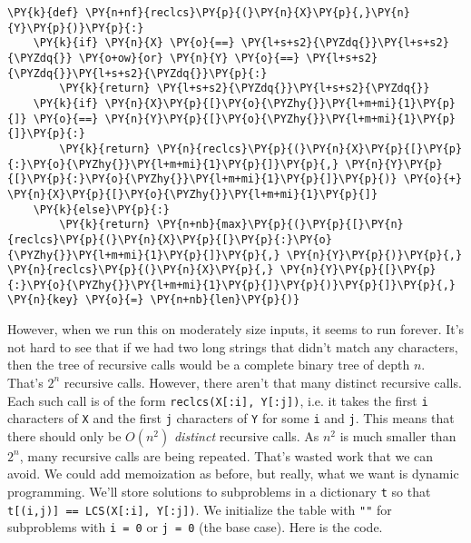 \begin{Verbatim}[commandchars=\\\{\}]
\PY{k}{def} \PY{n+nf}{reclcs}\PY{p}{(}\PY{n}{X}\PY{p}{,}\PY{n}{Y}\PY{p}{)}\PY{p}{:}
    \PY{k}{if} \PY{n}{X} \PY{o}{==} \PY{l+s+s2}{\PYZdq{}}\PY{l+s+s2}{\PYZdq{}} \PY{o+ow}{or} \PY{n}{Y} \PY{o}{==} \PY{l+s+s2}{\PYZdq{}}\PY{l+s+s2}{\PYZdq{}}\PY{p}{:}
        \PY{k}{return} \PY{l+s+s2}{\PYZdq{}}\PY{l+s+s2}{\PYZdq{}}
    \PY{k}{if} \PY{n}{X}\PY{p}{[}\PY{o}{\PYZhy{}}\PY{l+m+mi}{1}\PY{p}{]} \PY{o}{==} \PY{n}{Y}\PY{p}{[}\PY{o}{\PYZhy{}}\PY{l+m+mi}{1}\PY{p}{]}\PY{p}{:}
        \PY{k}{return} \PY{n}{reclcs}\PY{p}{(}\PY{n}{X}\PY{p}{[}\PY{p}{:}\PY{o}{\PYZhy{}}\PY{l+m+mi}{1}\PY{p}{]}\PY{p}{,} \PY{n}{Y}\PY{p}{[}\PY{p}{:}\PY{o}{\PYZhy{}}\PY{l+m+mi}{1}\PY{p}{]}\PY{p}{)} \PY{o}{+} \PY{n}{X}\PY{p}{[}\PY{o}{\PYZhy{}}\PY{l+m+mi}{1}\PY{p}{]}
    \PY{k}{else}\PY{p}{:}
        \PY{k}{return} \PY{n+nb}{max}\PY{p}{(}\PY{p}{[}\PY{n}{reclcs}\PY{p}{(}\PY{n}{X}\PY{p}{[}\PY{p}{:}\PY{o}{\PYZhy{}}\PY{l+m+mi}{1}\PY{p}{]}\PY{p}{,} \PY{n}{Y}\PY{p}{)}\PY{p}{,} \PY{n}{reclcs}\PY{p}{(}\PY{n}{X}\PY{p}{,} \PY{n}{Y}\PY{p}{[}\PY{p}{:}\PY{o}{\PYZhy{}}\PY{l+m+mi}{1}\PY{p}{]}\PY{p}{)}\PY{p}{]}\PY{p}{,} \PY{n}{key} \PY{o}{=} \PY{n+nb}{len}\PY{p}{)}
\end{Verbatim}



However, when we run this on moderately size inputs, it seems to run forever.
It's not hard to see that if we had two long strings that didn't match any characters, then the tree of recursive calls would be a complete binary tree of depth $n$.
That's $2^n$ recursive calls.
However, there aren't that many distinct recursive calls.
Each such call is of the form \texttt{reclcs(X[:i], Y[:j])}, i.e. it takes the first \texttt{i} characters of \texttt{X} and the first \texttt{j} characters of \texttt{Y} for some \texttt{i} and \texttt{j}.
This means that there should only be $O(n^2)$ \emph{distinct} recursive calls.  As $n^2$ is much smaller than $2^n$, many recursive calls are being repeated.
That's wasted work that we can avoid.
We could add memoization as before, but really, what we want is dynamic programming.
We'll store solutions to subproblems in a dictionary \texttt{t} so that \texttt{t[(i,j)] == LCS(X[:i], Y[:j])}.
We initialize the table with \texttt{""} for subproblems with \texttt{i = 0} or \texttt{j = 0} (the base case).
Here is the code.

